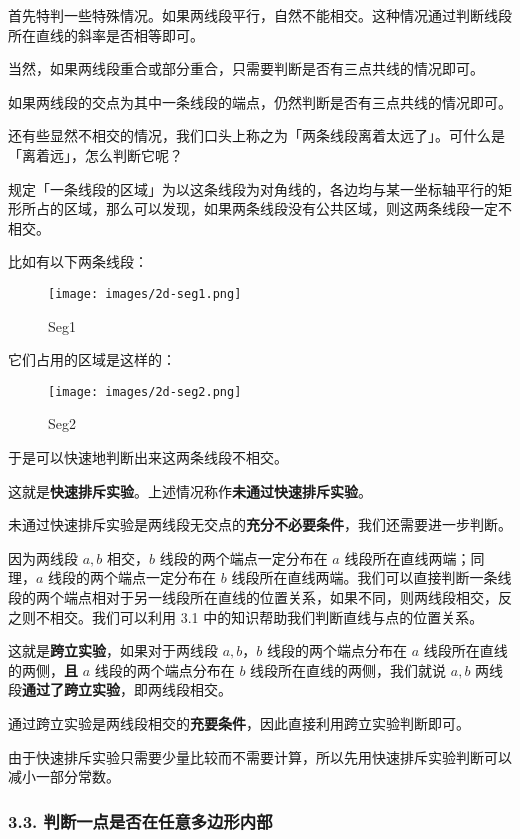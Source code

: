 首先特判一些特殊情况。如果两线段平行，自然不能相交。这种情况通过判断线段所在直线的斜率是否相等即可。

当然，如果两线段重合或部分重合，只需要判断是否有三点共线的情况即可。

如果两线段的交点为其中一条线段的端点，仍然判断是否有三点共线的情况即可。

还有些显然不相交的情况，我们口头上称之为「两条线段离着太远了」。可什么是「离着远」，怎么判断它呢？

规定「一条线段的区域」为以这条线段为对角线的，各边均与某一坐标轴平行的矩形所占的区域，那么可以发现，如果两条线段没有公共区域，则这两条线段一定不相交。

比如有以下两条线段：

\begin{figure}[h]
\centering
\texttt{[image: images/2d-seg1.png]} 
\caption{Seg1}
\end{figure}

它们占用的区域是这样的：

\begin{figure}[h]
\centering
\texttt{[image: images/2d-seg2.png]} 
\caption{Seg2}
\end{figure}

于是可以快速地判断出来这两条线段不相交。

这就是\textbf{快速排斥实验}。上述情况称作\textbf{未通过快速排斥实验}。

未通过快速排斥实验是两线段无交点的\textbf{充分不必要条件}，我们还需要进一步判断。

因为两线段 $a,b$ 相交，$b$ 线段的两个端点一定分布在 $a$ 线段所在直线两端；同理，$a$ 线段的两个端点一定分布在 $b$ 线段所在直线两端。我们可以直接判断一条线段的两个端点相对于另一线段所在直线的位置关系，如果不同，则两线段相交，反之则不相交。我们可以利用 3.1 中的知识帮助我们判断直线与点的位置关系。

这就是\textbf{跨立实验}，如果对于两线段 $a,b$，$b$ 线段的两个端点分布在 $a$ 线段所在直线的两侧，\textbf{且} $a$ 线段的两个端点分布在 $b$ 线段所在直线的两侧，我们就说 $a,b$ 两线段\textbf{通过了跨立实验}，即两线段相交。

通过跨立实验是两线段相交的\textbf{充要条件}，因此直接利用跨立实验判断即可。

由于快速排斥实验只需要少量比较而不需要计算，所以先用快速排斥实验判断可以减小一部分常数。

\subsubsection{3.3. 判断一点是否在任意多边形内部}

